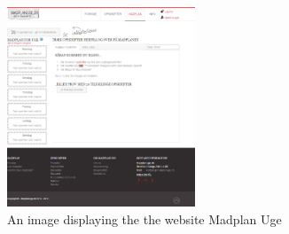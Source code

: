 \begin{figure}[H]
    \centering
    \includegraphics[width=0.5\textwidth]{Grafik/madplanuge}
    \caption{An image displaying the the website Madplan Uge}
    \label{MadPlanUge}
\end{figure}


